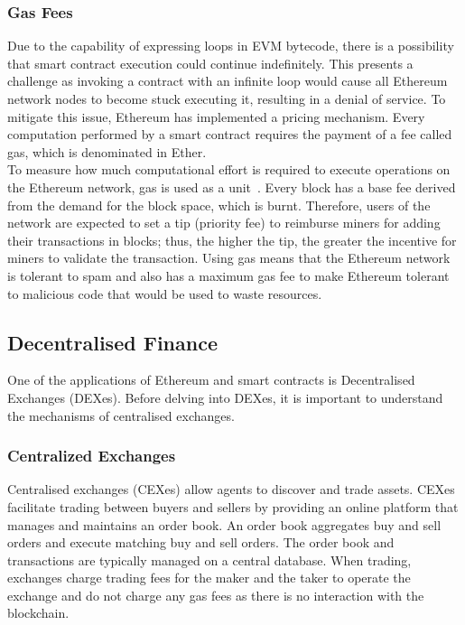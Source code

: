 \subsubsection{Gas Fees}
Due to the capability of expressing loops in EVM bytecode, there is a possibility that smart contract execution could continue indefinitely. This presents a challenge as invoking a contract with an infinite loop would cause all Ethereum network nodes to become stuck executing it, resulting in a denial of service. To mitigate this issue, Ethereum has implemented a pricing mechanism. Every computation performed by a smart contract requires the payment of a fee called gas, which is denominated in Ether.
\\[3mm]
To measure how much computational effort is required to execute operations on the Ethereum network, gas is used as a unit~\cite{noauthor_gas_nodate}. Every block has a base fee derived from the demand for the block space, which is burnt. Therefore, users of the network are expected to set a tip (priority fee) to reimburse miners for adding their transactions in blocks; thus, the higher the tip, the greater the incentive for miners to validate the transaction. Using gas means that the Ethereum network is tolerant to spam and also has a maximum gas fee to make Ethereum tolerant to malicious code that would be used to waste resources.

\subsection{Decentralised Finance}
One of the applications of Ethereum and smart contracts is Decentralised Exchanges (DEXes). Before delving into DEXes, it is important to understand the mechanisms of centralised exchanges.

\subsubsection{Centralized Exchanges}
Centralised exchanges (CEXes) allow agents to discover and trade assets. CEXes facilitate trading between buyers and sellers by providing an online platform that manages and maintains an order book. An order book aggregates buy and sell orders and execute matching buy and sell orders. The order book and transactions are typically managed on a central database. When trading, exchanges charge trading fees for the maker and the taker to operate the exchange and do not charge any gas fees as there is no interaction with the blockchain. 

